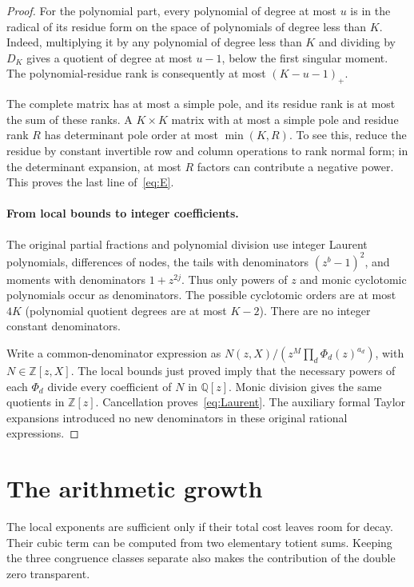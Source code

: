 \documentclass[11pt,letterpaper]{article}
\numberwithin{equation}{section}
\theoremstyle{remark}\newtheorem{remark}[theorem]{Remark}
\newcommand{\Q}{\mathbb Q}\newcommand{\Z}{\mathbb Z}\newcommand{\C}{\mathbb C}
\begin{document}
\begin{proof}
For the polynomial part, every polynomial of degree at most $u$ is in the radical of its residue form on the space of polynomials of degree less than $K$. Indeed, multiplying it by any polynomial of degree less than $K$ and dividing by $D_K$ gives a quotient of degree at most $u-1$, below the first singular moment. The polynomial-residue rank is consequently at most $(K-u-1)_+$.

The complete matrix has at most a simple pole, and its residue rank is at most the sum of these ranks. A $K\times K$ matrix with at most a simple pole and residue rank $R$ has determinant pole order at most $\min(K,R)$. To see this, reduce the residue by constant invertible row and column operations to rank normal form; in the determinant expansion, at most $R$ factors can contribute a negative power. This proves the last line of~\eqref{eq:E}.

\paragraph{From local bounds to integer coefficients.}
The original partial fractions and polynomial division use integer Laurent polynomials, differences of nodes, the tails with denominators $(z^b-1)^2$, and moments with denominators $1+z^{2j}$. Thus only powers of $z$ and monic cyclotomic polynomials occur as denominators. The possible cyclotomic orders are at most $4K$ (polynomial quotient degrees are at most $K-2$). There are no integer constant denominators.

Write a common-denominator expression as
$N(z,X)/(z^M\prod_d\Phi_d(z)^{a_d})$, with $N\in\Z[z,X]$. The local bounds just proved imply that the necessary powers of each $\Phi_d$ divide every coefficient of $N$ in $\Q[z]$. Monic division gives the same quotients in $\Z[z]$. Cancellation proves~\eqref{eq:Laurent}. The auxiliary formal Taylor expansions introduced no new denominators in these original rational expressions.
\end{proof}

\section{The arithmetic growth}
The local exponents are sufficient only if their total cost leaves room for decay. Their cubic term can be computed from two elementary totient sums. Keeping the three congruence classes separate also makes the contribution of the double zero transparent.
\end{document}
